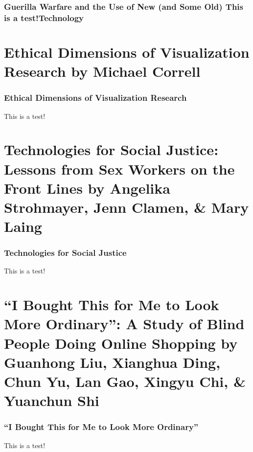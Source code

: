 \documentclass[aspectratio=169,10pt]{beamer} %
\begin{document}
\begin{frame}\frametitle{Guerilla Warfare and the Use of New (and Some Old) 
This is a test!Technology}
\end{frame}



\section[Ethical Dimensions of Visualization Research]{Ethical Dimensions of Visualization Research {\scriptsize \color{Black} by \textbf{Michael Correll}}}

\begin{frame}\frametitle{Ethical Dimensions of Visualization Research}
This is a test!
\end{frame}



\section[Technologies for Social Justice: Lessons from Sex Workers on the Front Lines]{Technologies for Social Justice: Lessons from Sex Workers on the Front Lines {\scriptsize \color{Black} by \textbf{Angelika Strohmayer}, \textbf{Jenn Clamen}, \& \textbf{Mary Laing}}}

\begin{frame}\frametitle{Technologies for Social Justice}
This is a test!
\end{frame}



\section[``I Bought This for Me to Look More Ordinary'': A Study of Blind People Doing Online Shopping]{``I Bought This for Me to Look More Ordinary'': A Study of Blind People Doing Online Shopping {\scriptsize \color{Black} by \textbf{Guanhong Liu}, \textbf{Xianghua Ding}, \textbf{Chun Yu}, \textbf{Lan Gao}, \textbf{Xingyu Chi}, \& \textbf{Yuanchun Shi}}}

\begin{frame}\frametitle{``I Bought This for Me to Look More Ordinary''}
This is a test!
\end{frame}





% 



% 

\end{document}
